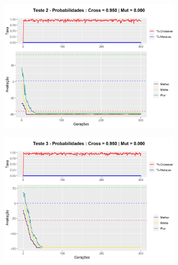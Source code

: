 \clearpage
\begin{figure}[h!]
	\centering
	\begin{subfigure}[b]{0.47\linewidth}
		\includegraphics[width=\linewidth]{imagens/graph_pc_0_950_pm_0_000_pop_50_g_300__2.png}
		\caption{}
	\end{subfigure}
	\begin{subfigure}[b]{0.47\linewidth}
		\includegraphics[width=\linewidth]{imagens/graph_pc_0_950_pm_0_000_pop_50_g_300__3.png}
		\caption{}
	\end{subfigure}
	\begin{subfigure}[b]{0.47\linewidth}

\end{subfigure}
\end{figure}
